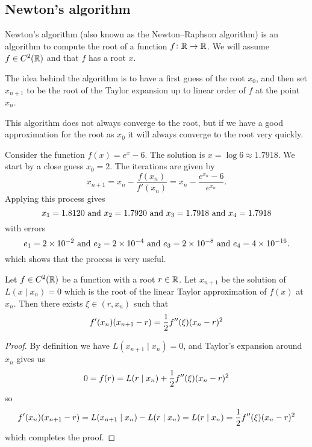 \documentclass[11pt,a4paper]{article}
\begin{document}

\subsection{Newton's algorithm}
Newton's algorithm (also known as the Newton--Raphson algorithm) is an algorithm
to compute the root of a function $f \colon \mathbb{R} \to \mathbb{R}$.
We will assume $f \in C^2(\mathbb{R})$ and that $f$ has a root $x$.

The idea behind the algorithm is to have a first guess of the root $x_0$,
and then set $x_{n+1}$ to be the root of the Taylor expansion up to linear
order of $f$ at the point $x_n$.

This algorithm does not always converge to the root,
but if we have a good approximation for the root as $x_0$ it will always
converge to the root very quickly.

\begin{example}
  Consider the function $f(x) = e^x - 6$.
  The solution is $x = \log 6 \approx 1.7918$.
  We start by a close guess $x_0 = 2$.
  The iterations are given by
  \[
    x_{n + 1} =
    x_n - \frac{f(x_n)}{f'(x_n)} =
    x_n - \frac{e^{x_n} - 6}{e^{x_n}}.
  \]
  Applying this process gives
  \[
    x_1 = 1.8120 \text{ and }
    x_2 = 1.7920 \text{ and }
    x_3 = 1.7918 \text{ and }
    x_4 = 1.7918
  \]
  with errors
  \[
    e_1 = 2 \times 10^{-2} \text{ and }
    e_2 = 2 \times 10^{-4} \text{ and }
    e_3 = 2 \times 10^{-8} \text{ and }
    e_4 = 4 \times 10^{-16}.
  \]
  which shows that the process is very useful.
\end{example}

\begin{lemma}
  \label{lem:newton-local}
  Let $f \in C^2(\mathbb{R})$ be a function with a root $r \in \mathbb{R}$.
  Let $x_{n + 1}$ be the solution of $L(x \mid x_n) = 0$ which is
  the root of the linear Taylor approximation of $f(x)$ at $x_n$.
  Then there exists $\xi \in (r,x_n)$ such that
  \[
    f'(x_n)(x_{n+1} - r) = \frac{1}{2} f''(\xi)(x_n - r)^2
  \]
\end{lemma}
\begin{proof}
  By definition we have $L(x_{n + 1} \mid x_n) = 0$, and Taylor's expansion
  around $x_n$ gives us
  \[
    0 = f(r) = L(r \mid x_n) + \frac{1}{2} f''(\xi)(x_n - r)^2
  \]
  so
  \[
    f'(x_n)(x_{n+1} - r) = L(x_{n + 1} \mid x_n) - L(r \mid x_n) =
    L(r \mid x_n) = \frac{1}{2} f''(\xi)(x_n - r)^2
  \]
  which completes the proof.
\end{proof}
\end{document}
